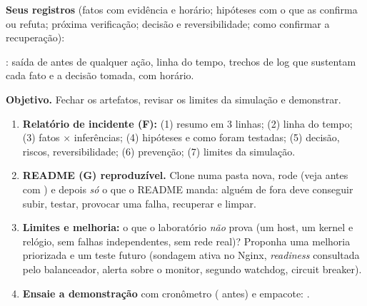 \textbf{Seus registros} (fatos com evidência e horário; hipóteses com o que as confirma ou refuta; próxima verificação; decisão e
reversibilidade; como confirmar a recuperação):

\begin{evid}
: saída de  antes de qualquer ação, linha do tempo, trechos de log que sustentam
cada fato e a decisão tomada, com horário.
\end{evid}


\textbf{Objetivo.} Fechar os artefatos, revisar os limites da simulação e demonstrar.

\begin{enumerate}[leftmargin=*]
  \item \textbf{Relatório de incidente (F):} (1) resumo em 3 linhas; (2) linha do tempo; (3) fatos $\times$ inferências;
        (4) hipóteses e como foram testadas; (5) decisão, riscos, reversibilidade; (6) prevenção; (7) limites da simulação.
  \item \textbf{README (G) reproduzível.} Clone numa pasta nova, rode  (veja antes com ) e depois \emph{só}
        o que o README manda: alguém de fora deve conseguir subir, testar, provocar uma falha, recuperar e limpar.
  \item \textbf{Limites e melhoria:} o que o laboratório \emph{não} prova (um host, um kernel e relógio, sem falhas
        independentes, sem rede real)? Proponha uma melhoria priorizada e um teste futuro (sondagem ativa no Nginx,
        \emph{readiness} consultada pelo balanceador, alerta sobre o monitor, segundo watchdog, circuit breaker).
  \item \textbf{Ensaie a demonstração} com cronômetro ( antes) e empacote:
        .
\end{enumerate}

